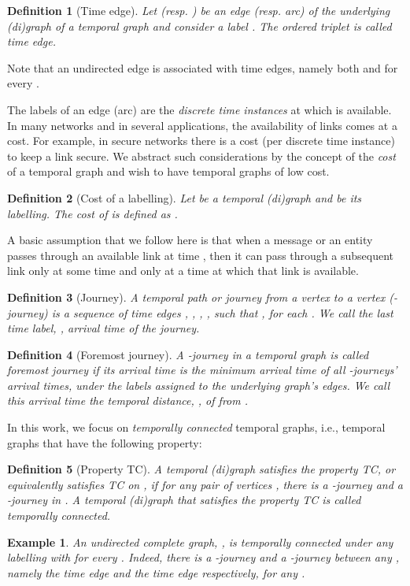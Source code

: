\documentclass[a4paper,UKenglish]{article}
\newtheorem{definition}{Definition}
\newtheorem*{example*}{Example}
\begin{document}
\begin{definition}[Time edge]
Let  (resp. ) be an edge (resp. arc) of the underlying (di)graph of a temporal graph and consider a label . The ordered triplet  is called \emph{time edge}.
\end{definition}

Note that an undirected edge  is associated with  time edges, namely both  and  for every .

The labels of an edge (arc)  are the \emph{discrete time instances} at which  is available. In many networks and in several applications, the availability of links comes at a cost. For example, in secure networks there is a cost (per discrete time instance) to keep a link secure. We abstract such considerations by the concept of the \emph{cost} of a temporal graph and wish to have temporal graphs of low cost.
\begin{definition}[Cost of a labelling]
Let  be a temporal (di)graph and  be its labelling. The \emph{cost} of  is defined as .
\end{definition}

A basic assumption that we follow here is that when a message or an entity passes through an available link at time , then it can pass through a subsequent link only at some time  and only at a time at which that link is available. 
\begin{definition}[Journey]
A \emph{temporal path} or \emph{journey}  from a vertex  to a vertex  {\emph (-journey)} is a sequence of time edges , ,  , , such that , for each . We call the last time label, , {\emph arrival time} of the journey.
\end{definition}
\begin{definition}[Foremost journey]
A -journey  in a temporal graph is called \emph{foremost journey} if its arrival time is the minimum arrival time of all -journeys' arrival times, under the labels assigned to the underlying graph's edges. We call this arrival time the \emph{temporal distance}, , of  from .
\end{definition}

In this work, we focus on \emph{temporally connected} temporal graphs, i.e., temporal graphs that have the following property:
\begin{definition}[Property TC]
A temporal (di)graph  satisfies the property TC, or equivalently  satisfies TC on , if for any pair of vertices , there is a -journey \emph{and} a -journey in . A temporal (di)graph that satisfies the property TC is called \emph{temporally connected}.
\end{definition}
\begin{example*}
An undirected complete graph, , is temporally connected under any labelling  with  for every . Indeed, there is a -journey and a -journey between any , namely the time edge  and the time edge  respectively, for any .
\end{example*}
\end{document}
